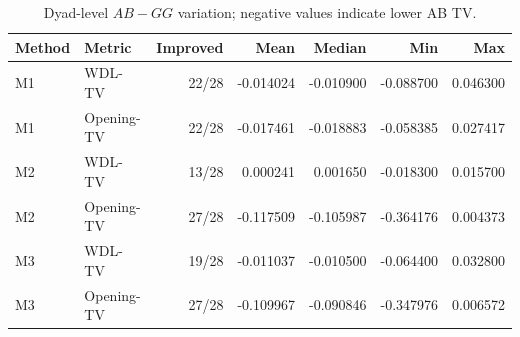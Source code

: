 \begin{table}[t]
\centering
\caption{Dyad-level $AB-GG$ variation; negative values indicate lower AB TV.}
\label{tab:dyad-summary}
\begin{tabular}{llrrrrr}
\toprule
Method & Metric & Improved & Mean & Median & Min & Max \\
\midrule
M1 & WDL-TV & 22/28 & -0.014024 & -0.010900 & -0.088700 & 0.046300 \\
M1 & Opening-TV & 22/28 & -0.017461 & -0.018883 & -0.058385 & 0.027417 \\
M2 & WDL-TV & 13/28 & 0.000241 & 0.001650 & -0.018300 & 0.015700 \\
M2 & Opening-TV & 27/28 & -0.117509 & -0.105987 & -0.364176 & 0.004373 \\
M3 & WDL-TV & 19/28 & -0.011037 & -0.010500 & -0.064400 & 0.032800 \\
M3 & Opening-TV & 27/28 & -0.109967 & -0.090846 & -0.347976 & 0.006572 \\
\bottomrule
\end{tabular}
\end{table}
